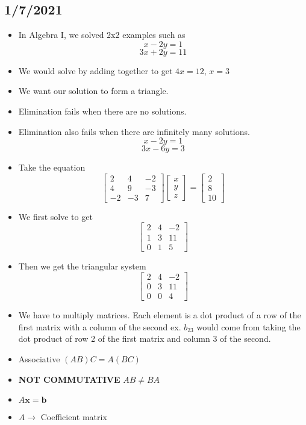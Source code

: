 \subsection{1/7/2021}
\begin{itemize}
    \item In Algebra I, we solved 2x2 examples such as $$x-2y=1$$$$3x+2y=11$$
    \item We would solve by adding together to get $4x=12$, $x=3$
    \item We want our solution to form a triangle.
    \item Elimination fails when there are no solutions.
    \item Elimination also fails when there are infinitely many solutions. $$x-2y=1$$$$3x-6y=3$$
    \item Take the equation $$\begin{bmatrix}2&4&-2\\4&9&-3\\-2&-3&7\end{bmatrix}\begin{bmatrix}x\\y\\z\end{bmatrix}=\begin{bmatrix}2\\8\\10\end{bmatrix}$$
    \item We first solve to get $$\begin{bmatrix}2&4&-2\\1&3&11\\0&1&5\end{bmatrix}$$
    \item Then we get the triangular system $$\begin{bmatrix}2&4&-2\\0&3&11\\0&0&4\end{bmatrix}$$
    \item We have to multiply matrices. Each element is a dot product of a row of the first matrix with a column of the second ex. $b_{23}$ would come from taking the dot product of row 2 of the first matrix and column 3 of the second.
    \item Associative $(AB)C=A(BC)$
    \item \textbf{NOT COMMUTATIVE} $AB\neq BA$
    \item $A\textbf{x}=\textbf{b}$
    \item $A\longrightarrow$ Coefficient matrix

\end{itemize}
